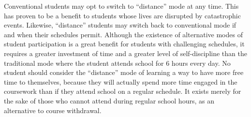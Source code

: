 \vskip 10pt

Conventional students may opt to switch to ``distance'' mode at any time.  This has proven to be a benefit to students whose lives are disrupted by catastrophic events.  Likewise, ``distance'' students may switch back to conventional mode if and when their schedules permit.  Although the existence of alternative modes of student participation is a great benefit for students with challenging schedules, it requires a greater investment of time and a greater level of self-discipline than the traditional mode where the student attends school for 6 hours every day.  No student should consider the ``distance'' mode of learning a way to have more free time to themselves, because they will actually spend more time engaged in the coursework than if they attend school on a regular schedule.  It exists merely for the sake of those who cannot attend during regular school hours, as an alternative to course withdrawal.


\vfil

\eject


